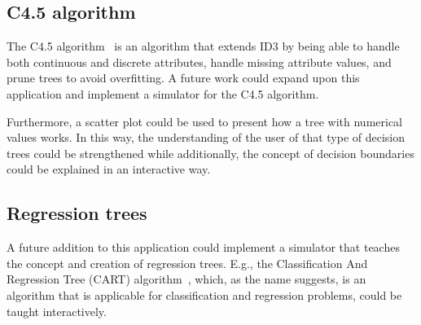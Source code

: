 \subsection{C4.5 algorithm}
The C4.5 algorithm~\cite{c4_5_wiki} is an algorithm that extends ID3 by being able to handle both continuous and discrete attributes, handle missing attribute values, and prune trees to avoid overfitting. A future work could expand upon this application and implement a simulator for the C4.5 algorithm.

Furthermore, a scatter plot could be used to present how a tree with numerical values works. In this way, the understanding of the user of that type of decision trees could be strengthened while additionally, the concept of decision boundaries could be explained in an interactive way.

\subsection{Regression trees}
A future addition to this application could implement a simulator that teaches the concept and creation of regression trees. E.g., the Classification And Regression Tree (CART) algorithm~\cite{cart}, which, as the name suggests, is an algorithm that is applicable for classification and regression problems, could be taught interactively.
